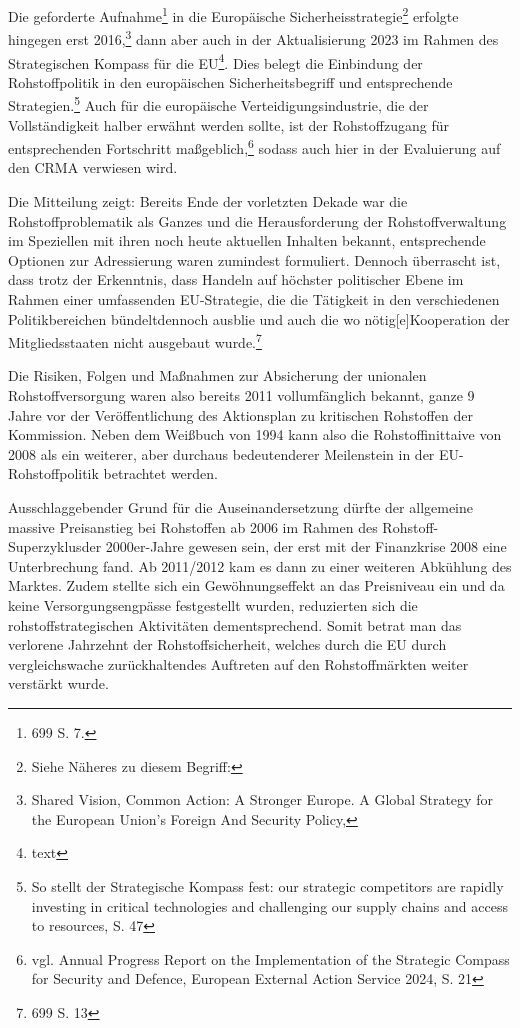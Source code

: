 \documentclass[12pt,a4paper,oneside]{book} %
\begin{document}
Die geforderte Aufnahme\footnote{699 S. 7.} in die Europäische Sicherheisstrategie\footnote{Siehe Näheres zu diesem Begriff:} erfolgte hingegen erst 2016,\footnote{Shared Vision, Common Action:
A Stronger Europe. A Global Strategy for the European Union’s Foreign And Security Policy,} dann aber auch in der Aktualisierung 2023 im Rahmen des \glqq Strategischen Kompass für die EU\grqq\footnote{text}. Dies belegt die Einbindung der Rohstoffpolitik in den europäischen Sicherheitsbegriff und entsprechende Strategien.\footnote{So stellt der Strategische Kompass fest: \glqq our strategic competitors are rapidly investing in critical technologies and challenging our supply chains and access to resources\grqq, S. 47} Auch für die europäische Verteidigungsindustrie, die der Vollständigkeit halber erwähnt werden sollte, ist der Rohstoffzugang für entsprechenden Fortschritt maßgeblich,\footnote{vgl. Annual Progress Report on the Implementation of the Strategic Compass for Security and Defence, European External Action Service 2024, S. 21} sodass auch hier in der Evaluierung auf den CRMA verwiesen wird.

Die Mitteilung zeigt: Bereits Ende der vorletzten Dekade war die Rohstoffproblematik als Ganzes und die Herausforderung der Rohstoffverwaltung im Speziellen mit ihren noch heute aktuellen Inhalten bekannt, entsprechende Optionen zur Adressierung waren zumindest formuliert. Dennoch überrascht ist, dass trotz der Erkenntnis, dass Handeln \glqq auf höchster politischer Ebene im Rahmen einer umfassenden EU-Strategie, die die Tätigkeit in den verschiedenen Politikbereichen bündelt\grqq dennoch ausblie und auch die \glqq wo nötig[e]\grqq Kooperation der Mitgliedsstaaten nicht ausgebaut wurde.\footnote{699 S. 13}

Die Risiken, Folgen und Maßnahmen zur Absicherung der unionalen Rohstoffversorgung waren also bereits 2011 vollumfänglich bekannt, ganze 9 Jahre vor der Veröffentlichung des Aktionsplan zu kritischen Rohstoffen der Kommission. Neben dem Weißbuch von 1994 kann also die Rohstoffinittaive von 2008 als ein weiterer, aber durchaus bedeutenderer Meilenstein in der EU-Rohstoffpolitik betrachtet werden.

Ausschlaggebender Grund für die Auseinandersetzung dürfte der allgemeine massive Preisanstieg bei Rohstoffen ab 2006 im Rahmen des \glqq Rohstoff-Superzyklus\grqq der 2000er-Jahre gewesen sein, der erst mit der Finanzkrise 2008 eine Unterbrechung fand.\autocite{Baffes, John and Haniotis, Tassos, Placing the 2006/08 Commodity Price Boom into Perspective (July 1, 2010). World Bank Policy Research Working Paper No. 5371, Available at SSRN: https://ssrn.com/abstract=1646794} Ab 2011/2012 kam es dann zu einer weiteren Abkühlung des Marktes. Zudem stellte sich ein Gewöhnungseffekt an das Preisniveau ein und da keine Versorgungsengpässe festgestellt wurden, reduzierten sich die rohstoffstrategischen Aktivitäten dementsprechend.\autocite{IW-Trends_2026-2-6_Neligan_et_al_Rohstoffe, S. 112} Somit betrat man das \glqq verlorene Jahrzehnt der Rohstoffsicherheit\grqq, welches durch die EU durch vergleichswache zurückhaltendes Auftreten auf den Rohstoffmärkten weiter verstärkt wurde.\autocite{Kullik, Verlorenes Jahrzehnt der Rohstoffsicherheit}
\end{document}
